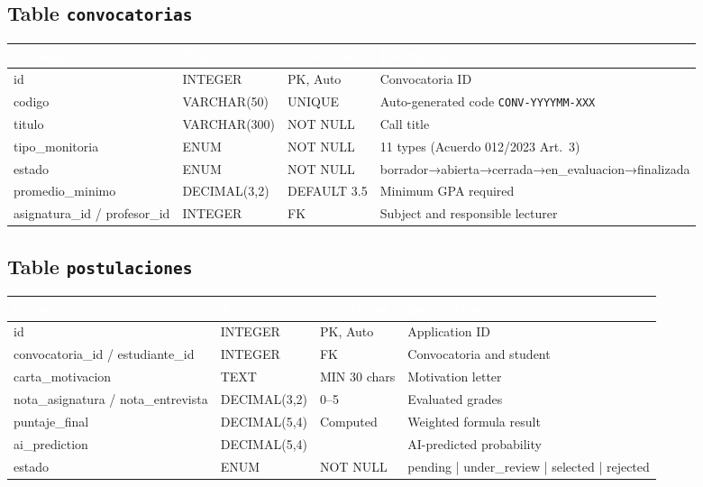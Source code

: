 \documentclass[12pt,a4paper,twoside]{report}
\begin{document}
\subsection{Table \texttt{convocatorias}}
\begin{center}
\begin{tabularx}{\textwidth}{|l|l|l|X|}
\hline
\rowcolor{tableHdr}
\textcolor{white}{\textbf{Column}} & \textcolor{white}{\textbf{Type}} &
\textcolor{white}{\textbf{Constraint}} & \textcolor{white}{\textbf{Description}} \\
\hline
\rowcolor{rowOdd}id & INTEGER & PK, Auto & Convocatoria ID \\
\hline\rowcolor{rowEven}codigo & VARCHAR(50) & UNIQUE & Auto-generated code \texttt{CONV-YYYYMM-XXX} \\
\hline\rowcolor{rowOdd}titulo & VARCHAR(300) & NOT NULL & Call title \\
\hline\rowcolor{rowEven}tipo\_monitoria & ENUM & NOT NULL & 11 types (Acuerdo 012/2023 Art.~3) \\
\hline\rowcolor{rowOdd}estado & ENUM & NOT NULL & borrador→abierta→cerrada→en\_evaluacion→finalizada \\
\hline\rowcolor{rowEven}promedio\_minimo & DECIMAL(3,2) & DEFAULT 3.5 & Minimum GPA required \\
\hline\rowcolor{rowOdd}asignatura\_id / profesor\_id & INTEGER & FK & Subject and responsible lecturer \\
\hline
\end{tabularx}
\end{center}

\subsection{Table \texttt{postulaciones}}
\begin{center}
\begin{tabularx}{\textwidth}{|l|l|l|X|}
\hline
\rowcolor{tableHdr}
\textcolor{white}{\textbf{Column}} & \textcolor{white}{\textbf{Type}} &
\textcolor{white}{\textbf{Constraint}} & \textcolor{white}{\textbf{Description}} \\
\hline
\rowcolor{rowOdd}id & INTEGER & PK, Auto & Application ID \\
\hline\rowcolor{rowEven}convocatoria\_id / estudiante\_id & INTEGER & FK & Convocatoria and student \\
\hline\rowcolor{rowOdd}carta\_motivacion & TEXT & MIN 30 chars & Motivation letter \\
\hline\rowcolor{rowEven}nota\_asignatura / nota\_entrevista & DECIMAL(3,2) & 0--5 & Evaluated grades \\
\hline\rowcolor{rowOdd}puntaje\_final & DECIMAL(5,4) & Computed & Weighted formula result \\
\hline\rowcolor{rowEven}ai\_prediction & DECIMAL(5,4) & & AI-predicted probability \\
\hline\rowcolor{rowOdd}estado & ENUM & NOT NULL & pending | under\_review | selected | rejected \\
\hline
\end{tabularx}
\end{center}
\end{document}
